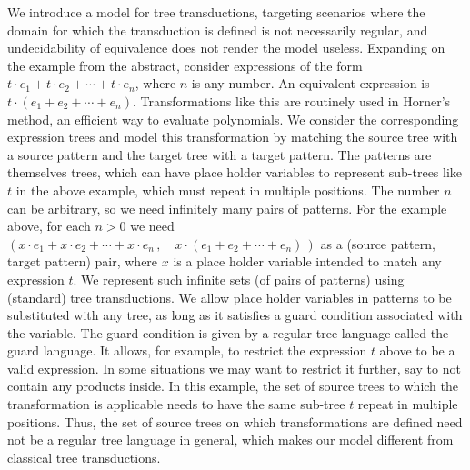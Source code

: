 We introduce a model for tree transductions, targeting scenarios where
the domain for which the transduction is defined is not necessarily
regular, and undecidability of equivalence does not render the model
useless. Expanding on the example from the abstract, consider
expressions of the form $t \cdot e_{1} + t \cdot e_{2} + \cdots + t
\cdot e_{n}$, where $n$ is any number. An equivalent expression is $t
\cdot (e_1 + e_2 + \cdots + e_n)$. Transformations like this are
routinely used in Horner's method, an efficient way to evaluate
polynomials. We consider the corresponding expression trees and model
this transformation by matching the source tree with a source pattern
and the target tree with a target pattern. The patterns are themselves
trees, which can have place holder variables to represent sub-trees
like $t$ in the above example, which must repeat in multiple
positions. The number $n$ can be arbitrary, so we need infinitely many
pairs of patterns. For the example above, for each $n >0$ we need $(x \cdot e_1 + x\cdot e_2 + \cdots + x\cdot e_n\,, \quad 
x\cdot (e_1 + e_2 + \cdots + e_n)\,)$ as a  (source pattern,  target
pattern) pair, where $x$ is a place holder
variable intended to match any  expression $t$. We represent such infinite sets (of pairs of
patterns) using (standard) tree transductions. We allow place holder
variables in patterns to be substituted with any tree, as long as it satisfies a guard condition associated with the variable. The guard condition is given by  a
regular tree language called the guard language. It allows, for example, to restrict the
expression $t$ above to be a valid expression. In some situations we may want to restrict it further, say to not contain any products inside.   In this example, the
set of source trees to which the transformation is applicable needs to
have the same sub-tree $t$ repeat in multiple positions. Thus, the set
of source trees on which transformations are defined need not be a
regular tree language in general, which makes our model different from
classical tree transductions. 


